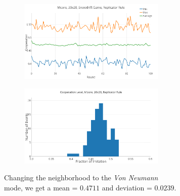 \documentclass[a4paper, 11pt]{article}
\begin{document}
\begin{figure}[H]
\begin{subfigure}{.55\textwidth}
	\begin{subfigure}{1\textwidth}
		\includegraphics[width=1\linewidth]{SDMoore20x20}
	\end{subfigure}

	\begin{subfigure}{1\textwidth}
		\includegraphics[width=1\linewidth]{SDMoore20x20HG}
	\end{subfigure}
\end{subfigure}%
\begin{subfigure}{.45\textwidth}
	Changing the neighborhood to the \textit{Von Neumann} mode, we get a mean = $0.4711$ and deviation = $0.0239$.
\end{subfigure}

\end{figure}





\newpage
\end{document}
